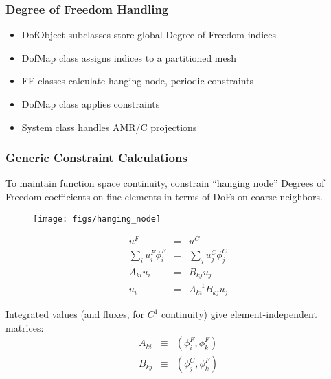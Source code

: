       
\begin{frame}[<+->]
\frametitle{Degree of Freedom Handling}

  \begin{block}{}
  \begin{itemize}
    \item{DofObject subclasses store global Degree of Freedom indices}
    \item{DofMap class assigns indices to a partitioned mesh}
    \item{FE classes calculate hanging node, periodic constraints}
    \item{DofMap class applies constraints}
    \item{System class handles AMR/C projections}
  \end{itemize}
  \end{block}
\end{frame}


\begin{frame}
\frametitle{Generic Constraint Calculations}

To maintain function space continuity, constrain ``hanging node''
Degrees of Freedom coefficients on fine elements in terms of DoFs on
coarse neighbors.

\begin{minipage}[h]{.45\textwidth}
  \begin{figure}[h]
    \begin{center}
      \texttt{[image: figs/hanging\_node]}
    \end{center}
  \end{figure}
\end{minipage}
\begin{minipage}[h]{.45\textwidth}
\begin{eqnarray*}
u^F & = & u^C \\
\sum_i u_i^F \phi_i^F & = & \sum_j u_j^C \phi_j^C \\
A_{ki} u_i & = & B_{kj} u_j \\
u_i & = & A_{ki}^{-1} B_{kj} u_j
\end{eqnarray*}
\end{minipage}

Integrated values (and fluxes, for $C^1$ continuity) give
element-independent matrices:
\begin{eqnarray*}
A_{ki} & \equiv & (\phi_i^F, \phi_k^F) \\
B_{kj} & \equiv & (\phi_j^C, \phi_k^F)
\end{eqnarray*}

\end{frame}



